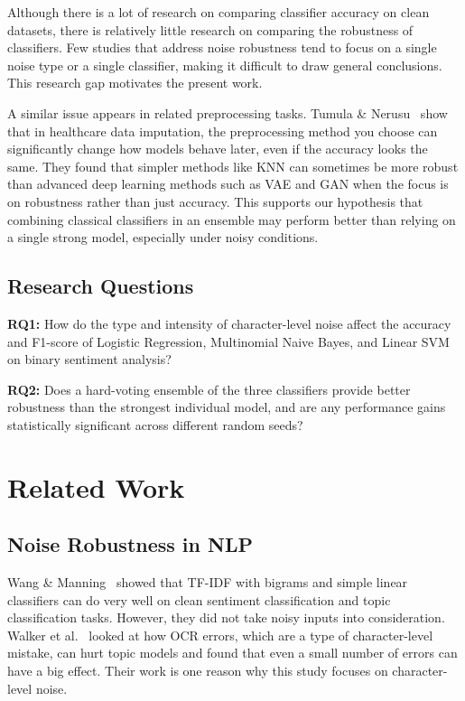 \documentclass[sigconf]{acmart}
\begin{document}
Although there is a lot of research on comparing classifier accuracy on clean
datasets, there is relatively little research on comparing the robustness of
classifiers. Few studies that address noise robustness tend to focus on a
single noise type or a single classifier, making it difficult to draw general
conclusions. This research gap motivates the present work.

A similar issue appears in related preprocessing tasks. Tumula \&
Nerusu~\cite{tumula2024} show that in healthcare data imputation, the
preprocessing method you choose can significantly change how models behave
later, even if the accuracy looks the same. They found that simpler methods
like KNN can sometimes be more robust than advanced deep learning methods such
as VAE and GAN when the focus is on robustness rather than just accuracy. This
supports our hypothesis that combining classical classifiers in an ensemble may
perform better than relying on a single strong model, especially under noisy
conditions.

\subsection*{Research Questions}

\textbf{RQ1:} How do the type and intensity of character-level noise affect the
accuracy and F1-score of Logistic Regression, Multinomial Naive Bayes, and
Linear SVM on binary sentiment analysis?

\textbf{RQ2:} Does a hard-voting ensemble of the three classifiers provide
better robustness than the strongest individual model, and are any performance
gains statistically significant across different random seeds?


\section{Related Work}

\subsection{Noise Robustness in NLP}
Wang \& Manning~\cite{wang2012} showed that TF-IDF with bigrams and simple
linear classifiers can do very well on clean sentiment classification and topic
classification tasks. However, they did not take noisy inputs into
consideration. Walker et al.~\cite{walker2010} looked at how OCR errors, which
are a type of character-level mistake, can hurt topic models and found that
even a small number of errors can have a big effect. Their work is one reason
why this study focuses on character-level noise.
\end{document}
